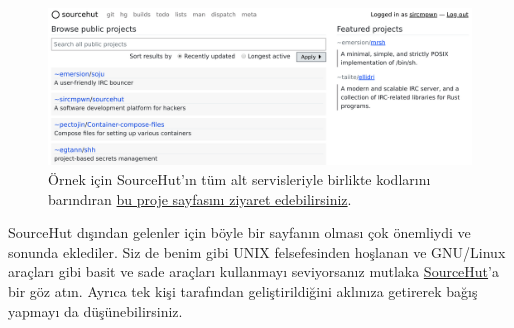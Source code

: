 \documentclass[11pt]{article}
\begin{document}
\begin{figure}[htbp]
\centering
\includegraphics[width=.9\linewidth]{gorseller/sourcehut-project-hub.png}
\caption{Örnek için SourceHut'ın tüm alt servisleriyle birlikte kodlarını barındıran \href{https://sr.ht/\~sircmpwn/sourcehut/}{bu proje sayfasını ziyaret edebilirsiniz}.}
\end{figure}

SourceHut dışından gelenler için böyle bir sayfanın olması çok önemliydi ve
sonunda eklediler. Siz de benim gibi UNIX felsefesinden hoşlanan ve GNU/Linux
araçları gibi basit ve sade araçları kullanmayı seviyorsanız mutlaka
\href{https://sourcehut.org}{SourceHut}'a bir göz atın. Ayrıca tek kişi tarafından geliştirildiğini aklınıza
getirerek bağış yapmayı da düşünebilirsiniz.
\end{document}
